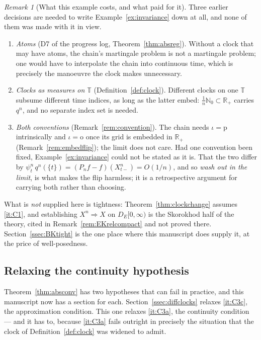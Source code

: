 \documentclass[11pt,a4paper]{article}
\theoremstyle{plain}
\theoremstyle{definition}
\theoremstyle{remark}
\newtheorem{remark}[theorem]{Remark}
\newcommand{\R}{\mathbb{R}}
\newcommand{\N}{\mathbb{N}}
\newcommand{\Rp}{\R_+}
\newcommand{\T}{\mathbb{T}}                     %
\newcommand{\DE}{D_E[0,\infty)}
\DeclareMathOperator*{\wto}{\Rightarrow}
\begin{document}
\begin{remark}[What this example costs, and what paid for it]
  \label{rem:invariancepay}
  Three earlier decisions are needed to write Example~\ref{ex:invariance} down at
  all, and none of them was made with it in view.
  \begin{enumerate}[label=(\roman*)]
  \item \emph{Atoms} (D7 of the progress log, Theorem~\ref{thm:absreg}).  Without
    a clock that may have atoms, the chain's martingale problem is not a
    martingale problem; one would have to interpolate the chain into continuous
    time, which is precisely the manoeuvre the clock makes unnecessary.
  \item \emph{Clocks as measures on $\T$} (Definition~\ref{def:clock}).  Different
    clocks on one $\T$ subsume different time indices, as long as the latter
    embed: $\frac1n\N_0 \subset \Rp$ carries $q^n$, and no separate index set is
    needed.
  \item \emph{Both conventions} (Remark~\ref{rem:convention}).  The chain needs
    $\iota = \mathrm{p}$ intrinsically and $\iota = \mathrm{o}$ once its grid is
    embedded in $\Rp$ (Remark~\ref{rem:embedflip}); the limit does not care.  Had
    one convention been fixed, Example~\ref{ex:invariance} could not be stated as
    it is.  That the two differ by
    $\psi^n_t \, q^n(\{t\}) = (P_nf-f)(X^n_{t-}) = O(1/n)$, and so
    \emph{wash out in the limit}, is what makes the flip harmless; it is a
    retrospective argument for carrying both rather than choosing.
  \end{enumerate}
  What is \emph{not} supplied here is tightness: Theorem~\ref{thm:clockchange}
  assumes \ref{it:C1}, and establishing $X^n \wto X$ on $\DE$ is the Skorokhod
  half of the theory, cited in Remark~\ref{rem:EKrelcompact} and not proved
  there.  Section~\ref{ssec:BKtight} is the one place where this manuscript does
  supply it, at the price of well-posedness.
\end{remark}

\subsection{Relaxing the continuity hypothesis}
\label{ssec:weakstrong}

Theorem~\ref{thm:absconv} has two hypotheses that can fail in practice, and this
manuscript now has a section for each.  Section~\ref{ssec:diffclocks} relaxes
\ref{it:C3c}, the approximation condition.  This one relaxes \ref{it:C3a}, the
continuity condition --- and it has to, because \ref{it:C3a} fails outright in
precisely the situation that the clock of Definition~\ref{def:clock} was widened
to admit.
\end{document}

